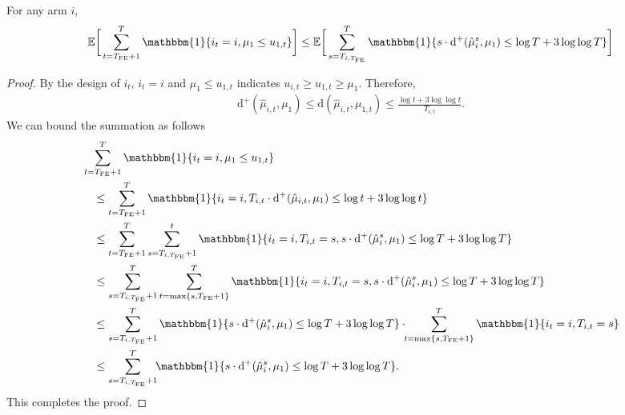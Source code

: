 \documentclass[twoside,11pt]{article}
\newcommand{\rmd}{\mathrm{d}}
\newcommand{\bbE}{\mathbb{E}}
\newcommand{\Tfe}{T_{\mathrm{FE}}}
\newcommand{\hatmu}{\hat{\mu}}
\begin{document}
\begin{lemma}\label{lem:KLUCBH_lem1}
    For any arm $i$,
    \begin{align}
        \bbE\bigg[ \sum_{t=\Tfe+1}^T\mathbbm{1}\{i_t=i,\mu_1\leq u_{1,t}\}\bigg]
        \leq
        \bbE\bigg[ \sum_{s=T_{i,\Tfe}}^T \mathbbm{1}\{s\cdot \rmd^+(\hatmu_i^s,\mu_1)\leq \log T+3 \log\log T\}\bigg]
    \end{align}
\end{lemma}
\begin{proof}
    By the design of $i_t$, $i_t=i$ and $\mu_1\leq u_{1,t}$ indicates $u_{i,t}\geq u_{1,t}\geq\mu_1$. Therefore, 
    \begin{align}
        \rmd^+(\hatmu_{i,t},\mu_1)\leq \rmd(\hatmu_{i,t},\mu_{1,t})\leq \frac{\log t+3 \log\log t}{T_{i,t}}.
    \end{align}
    We can bound the summation as follows
    \begin{align}
        & \sum_{t=\Tfe+1}^T\mathbbm{1}\{i_t=i,\mu_1\leq u_{1,t}\}
        \\
        &\quad\leq
        \sum_{t=\Tfe+1}^T\mathbbm{1}\{i_t=i,T_{i,t}\cdot \rmd^+(\hatmu_{i,t},\mu_1)\leq \log t+3 \log\log t\}
        \\
        &\quad\leq
        \sum_{t=\Tfe+1}^T\sum_{s=T_{i,\Tfe}+1}^t\mathbbm{1}\{i_t=i,T_{i,t}=s,s\cdot \rmd^+(\hatmu_{i}^s,\mu_1)\leq \log T+3 \log\log T\}
        \\
        &\quad\leq
        \sum_{s=T_{i,\Tfe}+1}^T \sum_{t=\max\{s,\Tfe+1\}}^T\mathbbm{1}\{i_t=i,T_{i,t}=s,s\cdot \rmd^+(\hatmu_{i}^s,\mu_1)\leq \log T+3 \log\log T\}
        \\
        &\quad\leq
        \sum_{s=T_{i,\Tfe}+1}^T \mathbbm{1}\{s\cdot \rmd^+(\hatmu_{i}^s,\mu_1)\leq \log T+3 \log\log T\}\cdot \!\!\sum_{t=\max\{s,\Tfe+1\}}^T\mathbbm{1}\{i_t=i,T_{i,t}=s\}
        \\
        &\quad\leq
        \sum_{s=T_{i,\Tfe}+1}^T \!\!\mathbbm{1}\{s\cdot \rmd^+(\hatmu_{i}^s,\mu_1)\leq \log T+3 \log\log T\}.
    \end{align}
    This completes the proof.
\end{proof}
\end{document}
